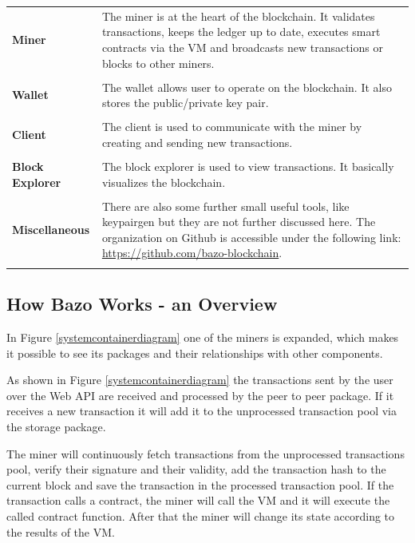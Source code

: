\begin{tabular}[t]{ p{3cm} p{12.5cm}}
\textbf{Miner} &
The miner is at the heart of the blockchain. It validates transactions, keeps the ledger up to date, executes smart contracts via the VM and broadcasts new transactions or blocks to other miners. \\ \\
 
\raggedright
\textbf{Wallet} &
The wallet allows user to operate on the blockchain. It also stores the public/private key pair. \cite{ba_wallet} \\ \\
 
\textbf{Client} &
The client is used to communicate with the miner by creating and sending new transactions. \\ \\

\raggedright
\textbf{Block Explorer} & 
The block explorer is used to view transactions. It basically visualizes the blockchain. \\ \\

\raggedright
\textbf{Miscellaneous} & 
There are also some further small useful tools, like keypairgen but they are not further discussed here. The organization on Github is accessible under the following link: \href{https://github.com/bazo-blockchain}{https://github.com/bazo-blockchain}. \\ \\
\end{tabular}

\subsection{How Bazo Works - an Overview}
In Figure \ref{systemcontainerdiagram} one of the miners is expanded, which makes it possible to see its packages and their relationships with other components. 

As shown in Figure \ref{systemcontainerdiagram} the transactions sent by the user over the Web API are received and processed by the peer to peer package. If it receives a new transaction it will add it to the unprocessed transaction pool via the storage package. 

The miner will continuously fetch transactions from the unprocessed transactions pool, verify their signature and their validity, add the transaction hash to the current block and save the transaction in the processed transaction pool. If the transaction calls a contract, the miner will call the VM and it will execute the called contract function. After that the miner will change its state according to the results of the VM.


